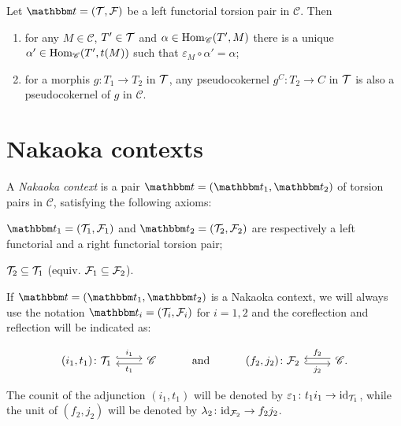 \begin{lemma}\label{5:lem:1}
  Let $\t=(\T,\F)$ be a left functorial torsion pair in $\mathscr{C}$. Then
\begin{enumerate}[label=(\alph*)]
\item\label{5:lem:1a} for any $M\in\mathscr{C}$, $T'\in\mathcal{T}$ and $\alpha\in\operatorname{Hom}_\mathscr{C}(T',M)$ there is a unique $\alpha'\in\operatorname{Hom}_\mathscr{C}(T',t(M))$ such that $\varepsilon_M\circ\alpha'=\alpha$;

\item\label{5:lem:1b} for a morphis $g:T_1\to T_2$ in $\mathcal{T}$, any pseudocokernel $g^C:T_2\to C$ in $\mathcal{T}$ is also a pseudocokernel of $g$ in $\mathscr{C}$.
\end{enumerate}
\end{lemma}

\section{Nakaoka contexts}

\begin{definition}
  A \emph{Nakaoka context} is a pair $\t=(\t_1,\t_2)$ of torsion pairs in $\mathscr{C}$, satisfying the following axioms:
  \begin{torsionaxioms}
    \item\label{ax:ct1} $\t_1=(\T_1,\F_1)$ and $\t_2=(\T_2,\F_2)$ are respectively a left functorial and a right functorial torsion pair;
    \item\label{ax:ct2} $\mathcal{T}_2\subseteq \mathcal{T}_1$ (equiv. $\mathcal{F}_1\subseteq\mathcal{F}_2$).
  \end{torsionaxioms}
\end {definition}

\begin{notation}
  If $\t=(\t_1,\t_2)$ is a Nakaoka context, we will always use the notation $\t_i = (\T_i,\F_i)$ for $i=1,2$ and the coreflection and reflection will be indicated as:

\begin{equation*}
\begin{tikzcd}
(i_1,t_1)\colon\T_1\arrow[hook, shift left]{r}{i_1}
& \mathscr{C}\arrow[shift left]{l}{t_1}
& \mathrm{and}
& (f_2,j_2)\colon\F_2\arrow[hook, shift right]{r}[']{j_2}
& \mathscr{C}\arrow[shift right]{l}[']{f_2}.
\end{tikzcd}
\end{equation*}

The counit of the adjunction $(i_1,t_1)$ will be denoted by $\varepsilon_1\colon t_1i_1\to \mathrm{id}_{\mathcal{T}_1}$, while the unit of $(f_2,j_2)$ will be denoted by $\lambda_2\colon \mathrm{id}_{\mathcal{F}_2}\to f_2j_2$.
\end{notation}

